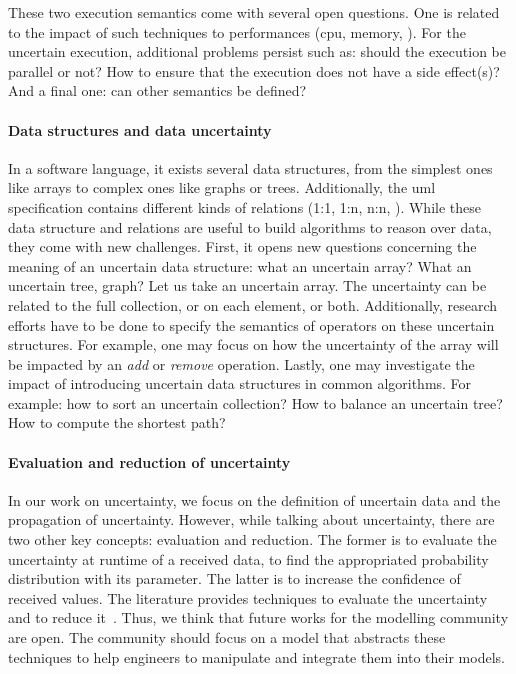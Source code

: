 These two execution semantics come with several open questions.
One is related to the impact of such techniques to performances (\gls{cpu}, memory, \etc).
For the uncertain execution, additional problems persist such as: should the execution be parallel or not? How to ensure that the execution does not have a side effect(s)?
And a final one: can other semantics be defined?

\paragraph{Data structures and data uncertainty}
In a software language, it exists several data structures, from the simplest ones like arrays to complex ones like graphs or trees.
Additionally, the \gls{uml} specification contains different kinds of relations (1:1, 1:n, n:n, \etc).
While these data structure and relations are useful to build algorithms to reason over data, they come with new challenges.
First, it opens new questions concerning the meaning of an uncertain data structure: what an uncertain array? What an uncertain tree, graph?
Let us take an uncertain array.
The uncertainty can be related to the full collection, or on each element, or both.
Additionally, research efforts have to be done to specify the semantics of operators on these uncertain structures.
For example, one may focus on how the uncertainty of the array will be impacted by an \textit{add} or \textit{remove} operation.
Lastly, one may investigate the impact of introducing uncertain data structures in common algorithms.
For example: how to sort an uncertain collection? How to balance an uncertain tree? How to compute the shortest path?

\paragraph{Evaluation and reduction of uncertainty}
In our work on uncertainty, we focus on the definition of uncertain data and the propagation of uncertainty.
However, while talking about uncertainty, there are two other key concepts: evaluation and reduction.
The former is to evaluate the uncertainty at runtime of a received data, \eg to find the appropriated probability distribution with its parameter.
The latter is to increase the confidence of received values.
The literature provides techniques to evaluate the uncertainty~\cite{wubbeler2008evaluation, metrology2008evaluation} and to reduce it~\cite{shafer1992dempster}.
Thus, we think that future works for the modelling community are open.
The community should focus on a \gls{model} that abstracts these techniques to help engineers to manipulate and integrate them into their models.


